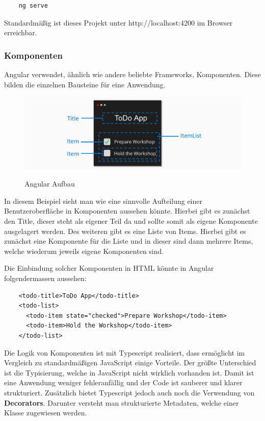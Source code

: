 \begin{lstlisting}
    ng serve
\end{lstlisting}

Standardmäßig ist dieses Projekt unter http://localhost:4200 im Browser erreichbar. 

\subsubsection{Komponenten}
Angular verwendet, ähnlich wie andere beliebte Frameworks, Komponenten. Diese bilden die einzelnen Bausteine für eine Anwendung.

\begin{figure}[h!]
    \centering
    \includegraphics[width=1\textwidth]{pics/angular-components.png }
    \caption{Angular Aufbau}
    \cite{frontend_web_angular_introduction}
    \label{fig:mesh1}
\end{figure}

In diesem Beispiel sieht man wie eine sinnvolle Aufteilung einer Benutzeroberfläche in Komponenten aussehen könnte. Hierbei gibt es zunächst den Title, dieser steht als eigener Teil da und sollte somit als eigene Komponente ausgelagert werden. Des weiteren gibt es eine Liste von Items. Hierbei gibt es zunächst eine Komponente für die Liste und in dieser sind dann mehrere Items, welche wiederum jeweils eigene Komponenten sind. 

Die Einbindung solcher Komponenten in HTML könnte in Angular folgendermassen aussehen:

\begin{lstlisting}
    <todo-title>ToDo App</todo-title>
    <todo-list>
      <todo-item state="checked">Prepare Workshop</todo-item>
      <todo-item>Hold the Workshop</todo-item>
    </todo-list>
\end{lstlisting}

Die Logik von Komponenten ist mit Typescript realisiert, dass ermöglicht im Vergleich zu standardmäßigen JavaScript einige Vorteile. Der größte Unterschied ist die Typisierung, welche in JavaScript nicht wirklich vorhanden ist. Damit ist eine Anwendung weniger fehleranfällig und der Code ist sauberer und klarer strukturiert. Zusätzlich bietet Typescript jedoch auch noch die Verwendung von \textbf{Decorators}. Darunter versteht man strukturierte Metadaten, welche einer Klasse zugewiesen werden. 

